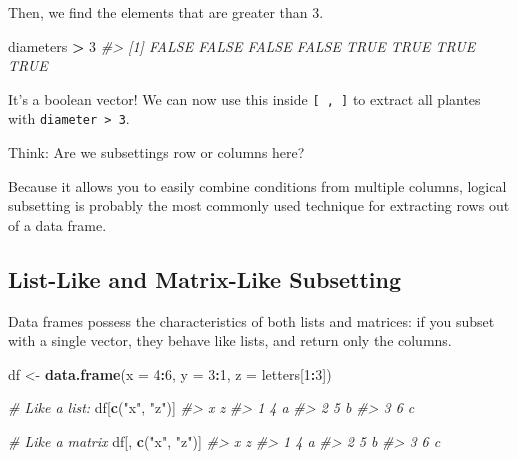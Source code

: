 \documentclass[]{book}
\newenvironment{Shaded}{\begin{snugshade}}{\end{snugshade}}
\newcommand{\KeywordTok}[1]{\textcolor[rgb]{0.13,0.29,0.53}{\textbf{#1}}}
\newcommand{\DataTypeTok}[1]{\textcolor[rgb]{0.13,0.29,0.53}{#1}}
\newcommand{\DecValTok}[1]{\textcolor[rgb]{0.00,0.00,0.81}{#1}}
\newcommand{\StringTok}[1]{\textcolor[rgb]{0.31,0.60,0.02}{#1}}
\newcommand{\CommentTok}[1]{\textcolor[rgb]{0.56,0.35,0.01}{\textit{#1}}}
\newcommand{\OperatorTok}[1]{\textcolor[rgb]{0.81,0.36,0.00}{\textbf{#1}}}
\newcommand{\NormalTok}[1]{#1}
\begin{document}
Then, we find the elements that are greater than 3.

\begin{Shaded}
\begin{Highlighting}[]
\NormalTok{diameters }\OperatorTok{>}\StringTok{ }\DecValTok{3}
\CommentTok{#> [1] FALSE FALSE FALSE FALSE  TRUE  TRUE  TRUE  TRUE}
\end{Highlighting}
\end{Shaded}

It's a boolean vector! We can now use this inside \texttt{{[}\ ,\ {]}}
to extract all plantes with \texttt{diameter\ \textgreater{}\ 3}.

Think: Are we subsettings row or columns here?

\begin{Shaded}
\end{Shaded}

Because it allows you to easily combine conditions from multiple
columns, logical subsetting is probably the most commonly used technique
for extracting rows out of a data frame.

\subsection{List-Like and Matrix-Like
Subsetting}\label{list-like-and-matrix-like-subsetting}

Data frames possess the characteristics of both lists and matrices: if
you subset with a single vector, they behave like lists, and return only
the columns.

\begin{Shaded}
\begin{Highlighting}[]
\NormalTok{df <-}\StringTok{ }\KeywordTok{data.frame}\NormalTok{(}\DataTypeTok{x =} \DecValTok{4}\OperatorTok{:}\DecValTok{6}\NormalTok{, }\DataTypeTok{y =} \DecValTok{3}\OperatorTok{:}\DecValTok{1}\NormalTok{, }\DataTypeTok{z =}\NormalTok{ letters[}\DecValTok{1}\OperatorTok{:}\DecValTok{3}\NormalTok{])}

\CommentTok{# Like a list:}
\NormalTok{df[}\KeywordTok{c}\NormalTok{(}\StringTok{"x"}\NormalTok{, }\StringTok{"z"}\NormalTok{)]}
\CommentTok{#>   x z}
\CommentTok{#> 1 4 a}
\CommentTok{#> 2 5 b}
\CommentTok{#> 3 6 c}

\CommentTok{# Like a matrix}
\NormalTok{df[, }\KeywordTok{c}\NormalTok{(}\StringTok{"x"}\NormalTok{, }\StringTok{"z"}\NormalTok{)]}
\CommentTok{#>   x z}
\CommentTok{#> 1 4 a}
\CommentTok{#> 2 5 b}
\CommentTok{#> 3 6 c}
\end{Highlighting}
\end{Shaded}
\end{document}
